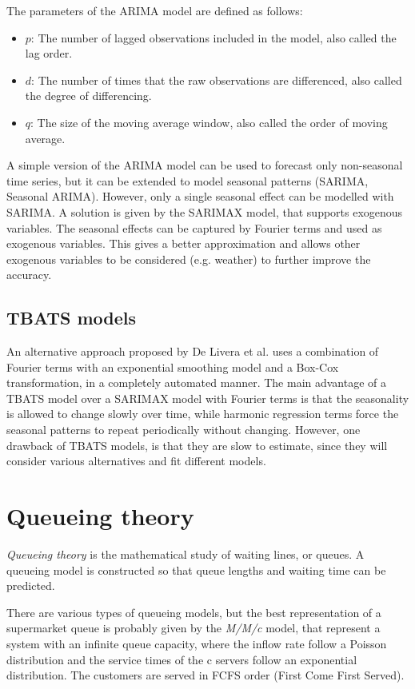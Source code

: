 The parameters of the ARIMA model are defined as follows:
\begin{itemize}
  \item \( p \): The number of lagged observations included in the model, also called the lag order.
  \item \( d \): The number of times that the raw observations are differenced, also called the degree of differencing.
  \item \( q \): The size of the moving average window, also called the order of moving average.
\end{itemize}

A simple version of the ARIMA model can be used to forecast only non-seasonal time series, but it can be extended to model seasonal patterns (SARIMA, Seasonal ARIMA). However, only a single seasonal effect can be modelled with SARIMA. A solution is given by the SARIMAX model, that supports exogenous variables. The seasonal effects can be captured by Fourier terms and used as exogenous variables. This gives a better approximation and allows other exogenous variables to be considered (e.g. weather) to further improve the accuracy.

\subsection{TBATS models}
\label{subsec:tbats_models}
An alternative approach proposed by De Livera et al. \cite{de_livera} uses a combination of Fourier terms with an exponential smoothing model and a Box-Cox transformation, in a completely automated manner. The main advantage of a TBATS model over a SARIMAX model with Fourier terms is that the seasonality is allowed to change slowly over time, while harmonic regression terms force the seasonal patterns to repeat periodically without changing. However, one drawback of TBATS models, is that they are slow to estimate, since they will consider various alternatives and fit different models.


\section{Queueing theory}
\label{sec:queueing_theory}

\emph{Queueing theory} is the mathematical study of waiting lines, or queues. A queueing model is constructed so that queue lengths and waiting time can be predicted.

There are various types of queueing models, but the best representation of a supermarket queue is probably given by the \emph{M/M/c} model, that represent a system with an infinite queue capacity, where the inflow rate follow a Poisson distribution and the service times of the c servers follow an exponential distribution. The customers are served in FCFS order (First Come First Served).

